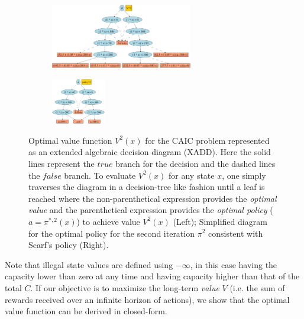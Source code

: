 \documentclass[twoside,11pt]{article}
\newcommand{\true}{\mathit{true}}
\newcommand{\false}{\mathit{false}}
\begin{document}
\begin{figure}[t!]
\centering
\begin{subfigure}
                \centering
                \includegraphics[width=0.68\textwidth]{Figures2/diagrams/inv-v2.pdf}
        \end{subfigure}
                \hspace{2mm}
\begin{subfigure}
                \centering
                \includegraphics[width=0.26\textwidth]{Figures2/diagrams/inv-p2.pdf}
        \end{subfigure}
\vspace{-2mm}
\caption{\footnotesize Optimal value function $V^2(x)$ for the
CAIC problem represented as an extended algebraic decision
diagram (XADD).  Here the solid lines represent the $\true$ branch for
the decision and the dashed lines the $\false$ branch.  To evaluate
$V^2(x)$ for any state $x$, one simply traverses the diagram in a
decision-tree like fashion until a leaf is reached where the
non-parenthetical expression provides the \emph{optimal value} and the
parenthetical expression provides the \emph{optimal policy} 
($a = \pi^{*,2}(x)$) to achieve value $V^2(x)$ (Left); Simplified diagram for the optimal policy for the second iteration $\pi^2$ consistent with Scarf's policy (Right).}
\label{fig:inv_policy}
\vspace{-6mm}
\end{figure}
Note that illegal state values are defined using $-\infty$, in this case having the capacity lower than zero at any time and having capacity higher than that of the total $C$. If our objective is to maximize the long-term \emph{value} $V$ (i.e. the sum of rewards received over an infinite horizon of actions), we show that the optimal value function can be derived in closed-form. 
\end{document}
